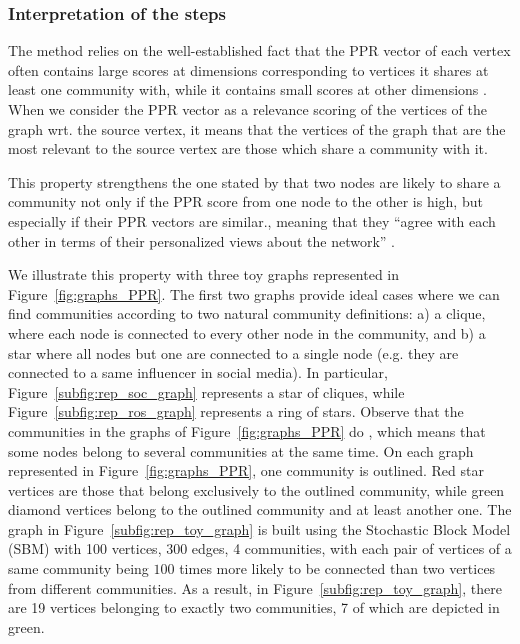 \subsubsection{Interpretation of the steps}\label{subsec:interpretation}


The \parfaite{} method relies on the well-established fact that the PPR vector of each vertex often contains large scores at dimensions corresponding to vertices it shares at least one community with, while it contains small scores at other dimensions \cite{Hollocou2017,Kloumann2014}. When we consider the PPR vector as a relevance scoring of the vertices of the graph wrt. the source vertex, it means that the vertices of the graph that are the most relevant to the source vertex are those which share a community with it.

This property strengthens the one stated by \cite{zhang_2020} that two nodes are likely to share a community not only if the PPR score from one node to the other is high, but especially if their PPR vectors are similar., meaning that they “agree with each other in terms of their personalized views about the network” \cite{zhang_2020}.


We illustrate this property with three toy graphs represented in Figure~\ref{fig:graphs_PPR}. The first two graphs provide ideal cases where we can find communities according to two natural community definitions: a) a clique, where each node is connected to every other node in the community,
and b) a star where all nodes but one are connected to a single node (e.g. they are connected to a same influencer in social media). In particular, Figure~\ref{subfig:rep_soc_graph} represents a star of cliques, while Figure~\ref{subfig:rep_ros_graph} represents a ring of stars. Observe that the communities in the graphs of Figure~\ref{fig:graphs_PPR} do , which means that some nodes belong to several communities at the same time. On each graph represented in Figure~\ref{fig:graphs_PPR}, one community is outlined. Red star vertices are those that belong exclusively to the outlined community, while green diamond vertices belong to the outlined community and at least another one. The graph in Figure~\ref{subfig:rep_toy_graph} is built using the Stochastic Block Model (SBM) with 100 vertices, 300 edges, 4 communities, with each pair of vertices of a same community being $100$ times more likely to be connected than two vertices from different communities. As a result, in Figure~\ref{subfig:rep_toy_graph}, there are 19 vertices belonging to exactly two communities, 7 of which are depicted in green. 

